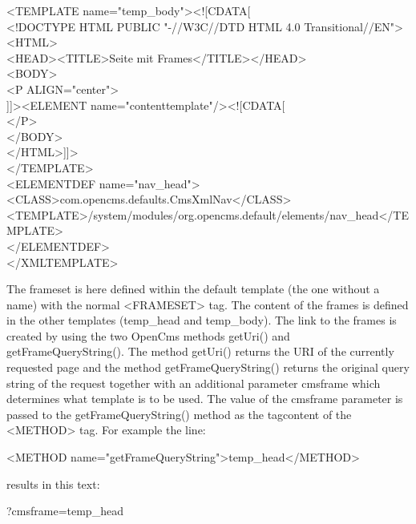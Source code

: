 \begin{xml}
<TEMPLATE name="temp\_body"><![CDATA[\\
\xtaba <!DOCTYPE HTML PUBLIC "-//W3C//DTD HTML 4.0 Transitional//EN">\\
\xtaba <HTML>\\
\xtaba   <HEAD><TITLE>Seite mit Frames</TITLE></HEAD>\\
\xtaba   <BODY>\\
\xtabb     <P ALIGN="center">\\
\xtabb       ]]><ELEMENT name="contenttemplate"/><![CDATA[\\
\xtabb     </P>\\
\xtaba   </BODY>\\
\xtaba </HTML>]]>\\
</TEMPLATE>\\

<ELEMENTDEF name="nav\_head">\\
\xtaba <CLASS>com.opencms.defaults.CmsXmlNav</CLASS>\\
\xtaba <TEMPLATE>/system/modules/org.opencms.default/elements/nav\_head</TEMPLATE> \\
</ELEMENTDEF>\\

</XMLTEMPLATE>\\
\end{xml}


The frameset is here defined within the default template (the one
without a name) with the normal {\tag <FRAMESET>} tag. The content
of the frames is defined in the other templates (temp\_head and temp\_body).
The link to the frames is created by using the two OpenCms methods
{\meth getUri()} and {\meth getFrameQueryString()}. The method
{\meth getUri()} returns the URI of the currently requested page
and the method {\meth getFrameQueryString()} returns the original query string
of the request together with an additional parameter {\name cmsframe}
which determines what template is to be used. The value of the
cmsframe parameter is passed to the {\meth getFrameQueryString()} method
as the tagcontent of the {\tag <METHOD>} tag. For example the 
line:

\begin{xml}
<METHOD name="getFrameQueryString">temp\_head</METHOD>\\
\end{xml}

results in this text:
\begin{xml}
?cmsframe=temp\_head
\end{xml}

